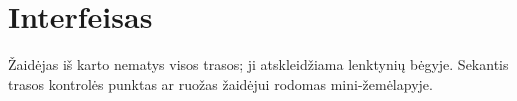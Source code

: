 \section{Interfeisas}

Žaidėjas iš karto nematys visos trasos; ji atskleidžiama lenktynių bėgyje.
Sekantis trasos kontrolės punktas ar ruožas žaidėjui rodomas mini-žemėlapyje.
